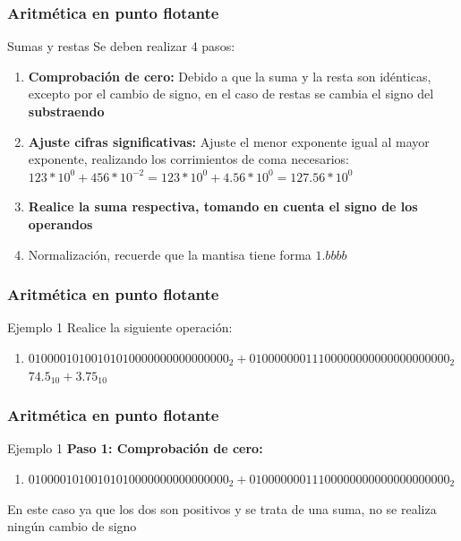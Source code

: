 \documentclass{beamer}
\begin{document}
\begin{frame}
	\frametitle{Aritmética en punto flotante}
	\begin{block}{Sumas y restas}
	Se deben realizar 4 pasos:
	\begin{enumerate}
		\item \textbf{Comprobación de cero:} Debido a que la suma y la resta son idénticas, excepto por el cambio de signo, en el caso de restas se cambia el signo del \textbf{substraendo}
		\item \textbf{Ajuste cifras significativas:} Ajuste el menor exponente igual al mayor exponente, realizando los corrimientos de coma necesarios:\\
		$123*10^0 + 456*10^{-2} = 123*10^0 + 4.56*10^{0} = 127.56*10^{0}$
		\item \textbf{Realice la suma respectiva, tomando en cuenta el signo de los operandos}
		\item Normalización, recuerde que la mantisa tiene forma $1.bbbb$
	\end{enumerate}	
	\end{block}
\end{frame}

\begin{frame}
	\frametitle{Aritmética en punto flotante}
	\begin{block}{Ejemplo 1}
	Realice la siguiente operación:
	\begin{enumerate}
		\item $01000010100101010000000000000000_{2} + 01000000011100000000000000000000_{2}$ 
		\\ $74.5_{10} + 3.75_{10}$
	\end{enumerate}	
	\end{block}
\end{frame}

\begin{frame}
	\frametitle{Aritmética en punto flotante}
	\begin{block}{Ejemplo 1}
	\textbf{Paso 1: Comprobación de cero:}
	\begin{enumerate}
		\item $01000010100101010000000000000000_{2} + 01000000011100000000000000000000_{2}$ 
	\end{enumerate}	
	En este caso ya que los dos son positivos y se trata de una suma, no se realiza ningún cambio de signo
	\end{block}
\end{frame}
\end{document}
